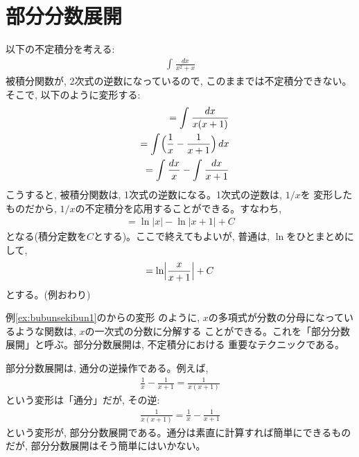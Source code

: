 \section{部分分数展開}
\begin{exmpl}\label{ex:bubunsekibun1} 以下の不定積分を考える:
\begin{eqnarray}
\int_{}^{} \frac{dx}{x^2+x}
\end{eqnarray}
被積分関数が, 2次式の逆数になっているので, このままでは不定積分できない。
そこで, 以下のように変形する:
\begin{eqnarray}
&&=\int_{}^{} \frac{dx}{x(x+1)}\label{eq:bubunsekibun3}\\
&&=\int_{}^{} \Bigl(\frac{1}{x}-\frac{1}{x+1}\Bigr)\label{eq:bubunsekibun4}\,dx\\
&&=\int_{}^{} \frac{dx}{x}-\int_{}^{}\frac{dx}{x+1}
\end{eqnarray}
こうすると, 被積分関数は, 1次式の逆数になる。1次式の逆数は, $1/x$を
変形したものだから, $1/x$の不定積分を応用することができる。すなわち, 
\begin{eqnarray}
=\ln |x| - \ln |x+1| + C
\end{eqnarray}
となる(積分定数を$C$とする)。ここで終えてもよいが, 普通は, $\ln$をひとまとめにして, 
\begin{eqnarray}
=\ln \Bigl|\frac{x}{x+1}\Bigr| + C
\end{eqnarray}
とする。(例おわり)
\end{exmpl}

例\ref{ex:bubunsekibun1}のからの変形
のように, $x$の多項式が分数の分母になっているような関数は, $x$の一次式の分数に分解する
ことができる。これを「部分分数展開」と呼ぶ。部分分数展開は, 不定積分における
重要なテクニックである。\hv

部分分数展開は, 通分の逆操作である。例えば, 
\begin{eqnarray}
\frac{1}{x}-\frac{1}{x+1}=\frac{1}{x(x+1)}
\end{eqnarray}
という変形は「通分」だが, その逆:
\begin{eqnarray}
\frac{1}{x(x+1)}=\frac{1}{x}-\frac{1}{x+1}
\end{eqnarray}
という変形が, 部分分数展開である。通分は素直に計算すれば簡単にできるものだが, 
部分分数展開はそう簡単にはいかない。

